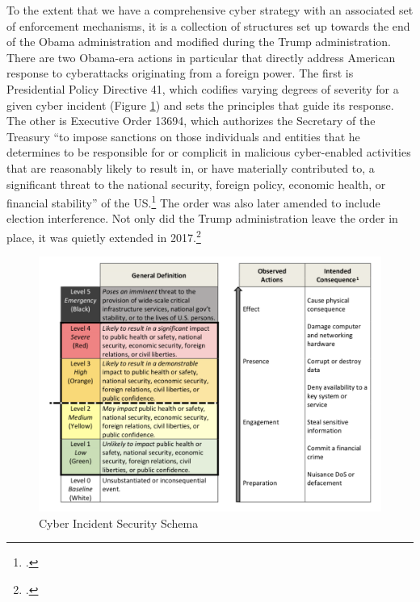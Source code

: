 \documentclass{memoir}
\begin{document}
\begin{refsegment}
To the extent that we have a comprehensive cyber strategy with an associated set of enforcement mechanisms, it is a collection of structures set up towards the end of the Obama administration and modified during the Trump administration. There are two Obama-era actions in particular that directly address American response to cyberattacks originating from a foreign power. The first is Presidential Policy Directive 41, which codifies varying degrees of severity for a given cyber incident (Figure \ref{severity-schema}) and sets the principles that guide its response. The other is Executive Order 13694, which authorizes the Secretary of the Treasury ``to impose sanctions on those individuals and entities that he determines to be responsible for or complicit in malicious cyber-enabled activities that are reasonably likely to result in, or have materially contributed to, a significant threat to the national security, foreign policy, economic health, or financial stability'' of the US.\footcite{daniel_our_2015} The order was also later amended to include election interference. Not only did the Trump administration leave the order in place, it was quietly extended in 2017.\footcite{uchill_white_2017}

\begin{figure}
\centering
\includegraphics[scale=0.53]{severity-schema.png}
\caption{Cyber Incident Security Schema}
\label{severity-schema}
\end{figure}


\end{refsegment}
\end{document}
